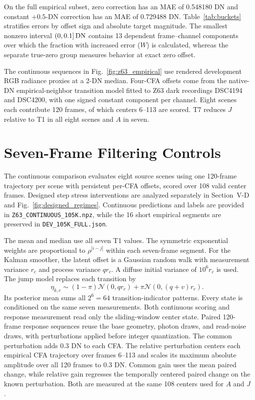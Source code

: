 On the full empirical subset, zero correction has an MAE of 0.548180 DN and constant $+0.5$-DN correction has an MAE of 0.729488 DN. Table~\ref{tab:buckets} stratifies errors by offset sign and absolute target magnitude. The smallest nonzero interval $(0,0.1]\,\mathrm{DN}$ contains 13 dependent frame--channel components over which the fraction with increased error ($W$) is calculated, whereas the separate true-zero group measures behavior at exact zero offset.

The continuous sequences in Fig.~\ref{fig:z63_empirical} use rendered development RGB radiance proxies at a 2-DN median. Four-CFA offsets come from the native-DN empirical-neighbor transition model fitted to Z63 dark recordings DSC4194 and DSC4200, with one signed constant component per channel. Eight scenes each contribute 120 frames, of which centers 6--113 are scored. T7 reduces $J$ relative to T1 in all eight scenes and $A$ in seven.


\section{Seven-Frame Filtering Controls}
\label{app:filters}
The continuous comparison evaluates eight source scenes using one 120-frame trajectory per scene with persistent per-CFA offsets, scored over 108 valid center frames. Designed step stress interventions are analyzed separately in Section~V-D and Fig.~\ref{fig:designed_regimes}. Continuous predictions and labels are provided in \texttt{Z63\_CONTINUOUS\_105K.npz}, while the 16 short empirical segments are preserved in \texttt{DEV\_105K\_FULL.json}.

The mean and median use all seven T1 values. The symmetric exponential weights are proportional to $\rho^{|i-j|}$ within each seven-frame segment. For the Kalman smoother, the latent offset is a Gaussian random walk with measurement variance $r_c$ and process variance $qr_c$. A diffuse initial variance of $10^6r_c$ is used. The jump model replaces each transition by
\begin{equation}
 \eta_{k,c}\sim(1-\pi)\mathcal N(0,qr_c)+\pi\mathcal N(0,(q+v)r_c).
\end{equation}
Its posterior mean sums all $2^6=64$ transition-indicator patterns. Every state is conditioned on the same seven measurements. Both continuous scoring and response measurement read only the sliding-window center state. Paired 120-frame response sequences reuse the base geometry, photon draws, and read-noise draws, with perturbations applied before integer quantization. The common perturbation adds 0.3 DN to each CFA. The relative perturbation centers each empirical CFA trajectory over frames 6--113 and scales its maximum absolute amplitude over all 120 frames to 0.3 DN. Common gain uses the mean paired change, while relative gain regresses the temporally centered paired change on the known perturbation. Both are measured at the same 108 centers used for $A$ and $J$.

